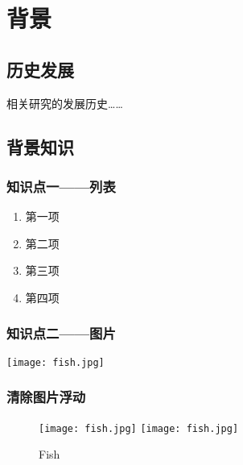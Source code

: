 \newpage
\chapter{背景}

\section{历史发展}
相关研究的发展历史……
\section{背景知识}
\subsection{知识点一——列表}

\begin{enumerate}
	\item 第一项
	\item 第二项
	\item 第三项
	\item 第四项
\end{enumerate}
\subsection{知识点二——图片}
\begin{center}
	\texttt{[image: fish.jpg]}  \\  
\end{center}
\par
\subsection{清除图片浮动}
\begin{figure}[htb]
  \centering
  \texttt{[image: fish.jpg]}
  \texttt{[image: fish.jpg]}\\
  \caption{Fish}
\end{figure}


















